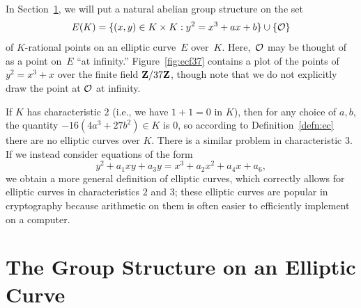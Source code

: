 In Section~\ref{sec:ellgrp}, we will put  a natural abelian
group structure on the set
$$
E(K) = \{ (x,y)\in K\times K : y^2 = x^3 + ax +b \} \cup \{\mathcal{O}\}
$$
of $K$-rational points on an elliptic curve~$E$ over~$K$.
Here,~$\mathcal{O}$ may be thought of as a point on~$E$ ``at infinity.''
Figure~\ref{fig:ecf37} contains a plot of the points
of $y^2=x^3+x$ over the finite field
$\mathbf{Z}/37\mathbf{Z}{}$, though note that we do not explicitly draw the
point at $\mathcal{O}$ at infinity.


\begin{remark}
  If $K$ has characteristic $2$ (i.e., we have $1+1 = 0$ in $K$), then
  for any choice of $a,b$, the quantity $-16(4a^3+27b^2)\in K$ is $0$,
  so according to Definition~\ref{defn:ec} there are no elliptic
  curves over $K$.  There is a similar problem in characteristic $3$.
  If we instead consider equations of the form
$$
  y^2 + a_1 xy + a_3 y = x^3 + a_2 x^2 + a_4 x + a_6,
$$
we obtain a more general definition of elliptic curves, which
correctly allows for elliptic curves in characteristics $2$ and $3$;
these elliptic curves are popular in cryptography because arithmetic
on them is often easier to efficiently implement on a computer.
\end{remark}



\section{The Group Structure on an Elliptic Curve}\label{sec:ellgrp}


